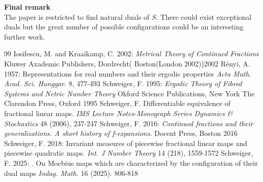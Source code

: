 \documentclass[12pt]{article}
\begin{document}
	{\bf Final remark}\\
	
	The paper is restricted to find natural duals of $S$. There could exist  exceptional duals but the great number of possible configurations could be an interesting further work.
				
				
	\begin{thebibliography}{99}
		 Iosifescu, M. and Kraaikamp, C. 2002: {\em Metrical Theory of Continued Fractions} Kluwer Axademic Publishers, Dordrecht( Boston(London 2002))2002
		 Rényi, A. 1957: Representations for real numbers and their ergodic properties {\em Acta Math. Acad. Sci. Hunggar.} 8, 477-493 
		 Schweiger, F. 1995: {\em Ergodic Theory of Fibred Systems and Netric Number Theory} Okford Science Publications, New York The Clarendon Press, Oxford 1995	
		 Schweiger, F.  Differentiable equivalence of fractional linear maps.
		{\em IMS Lecture Notes-Monograph Series Dynamics \& Stochastics} 48
		(2006), 237-247
		 Schweiger, F. 2016: {\em Continued fractions and their   generalizations. A short history of f-expansions}. Docent Press, Boston 2016
	  Schweiger, F. 2018: Invariant measures of piecewise fractional linear maps and piecewise quadratic maps. {\em Int. J Number Theory} 14 (218), 1559-1572
	  Schweiger, F. 2025: . On Moebius maps which are characterized by the configuration of their dual maps 
	 {\em Indag. Math.} 16 (2025). 806-818
	 
	 
	\end{thebibliography}
	
\end{document}
